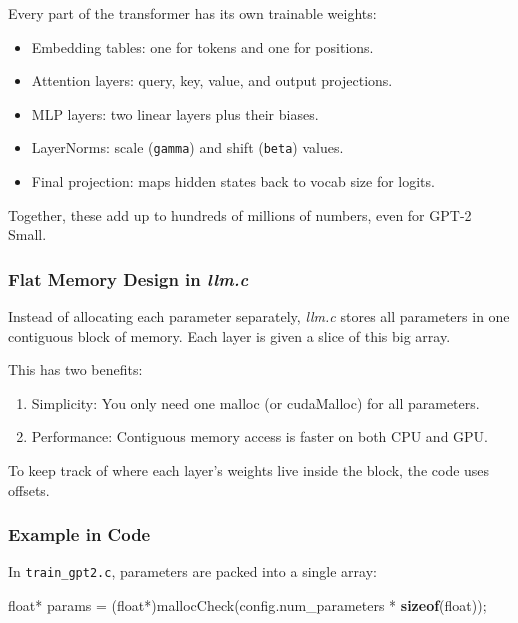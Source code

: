 \documentclass[
  letterpaper,
  DIV=11,
  numbers=noendperiod]{scrreprt}
\newenvironment{Shaded}{\begin{snugshade}}{\end{snugshade}}
\newcommand{\DataTypeTok}[1]{\textcolor[rgb]{0.68,0.00,0.00}{#1}}
\newcommand{\KeywordTok}[1]{\textcolor[rgb]{0.00,0.23,0.31}{\textbf{#1}}}
\newcommand{\NormalTok}[1]{\textcolor[rgb]{0.00,0.23,0.31}{#1}}
\newcommand{\OperatorTok}[1]{\textcolor[rgb]{0.37,0.37,0.37}{#1}}
\providecommand{\tightlist}{%
  \setlength{\itemsep}{0pt}\setlength{\parskip}{0pt}}
\begin{document}
Every part of the transformer has its own trainable weights:

\begin{itemize}
\tightlist
\item
  Embedding tables: one for tokens and one for positions.
\item
  Attention layers: query, key, value, and output projections.
\item
  MLP layers: two linear layers plus their biases.
\item
  LayerNorms: scale (\texttt{gamma}) and shift (\texttt{beta}) values.
\item
  Final projection: maps hidden states back to vocab size for logits.
\end{itemize}

Together, these add up to hundreds of millions of numbers, even for
GPT-2 Small.

\subsubsection{\texorpdfstring{Flat Memory Design in
\emph{llm.c}}{Flat Memory Design in llm.c}}\label{flat-memory-design-in-llm.c}

Instead of allocating each parameter separately, \emph{llm.c} stores all
parameters in one contiguous block of memory. Each layer is given a
slice of this big array.

This has two benefits:

\begin{enumerate}
\def\labelenumi{\arabic{enumi}.}
\tightlist
\item
  Simplicity: You only need one malloc (or cudaMalloc) for all
  parameters.
\item
  Performance: Contiguous memory access is faster on both CPU and GPU.
\end{enumerate}

To keep track of where each layer's weights live inside the block, the
code uses offsets.

\subsubsection{Example in Code}\label{example-in-code}

In \texttt{train\_gpt2.c}, parameters are packed into a single array:

\begin{Shaded}
\begin{Highlighting}[]
\DataTypeTok{float}\OperatorTok{*}\NormalTok{ params }\OperatorTok{=} \OperatorTok{(}\DataTypeTok{float}\OperatorTok{*)}\NormalTok{mallocCheck}\OperatorTok{(}\NormalTok{config}\OperatorTok{.}\NormalTok{num\_parameters }\OperatorTok{*} \KeywordTok{sizeof}\OperatorTok{(}\DataTypeTok{float}\OperatorTok{));}
\end{Highlighting}
\end{Shaded}
\end{document}
